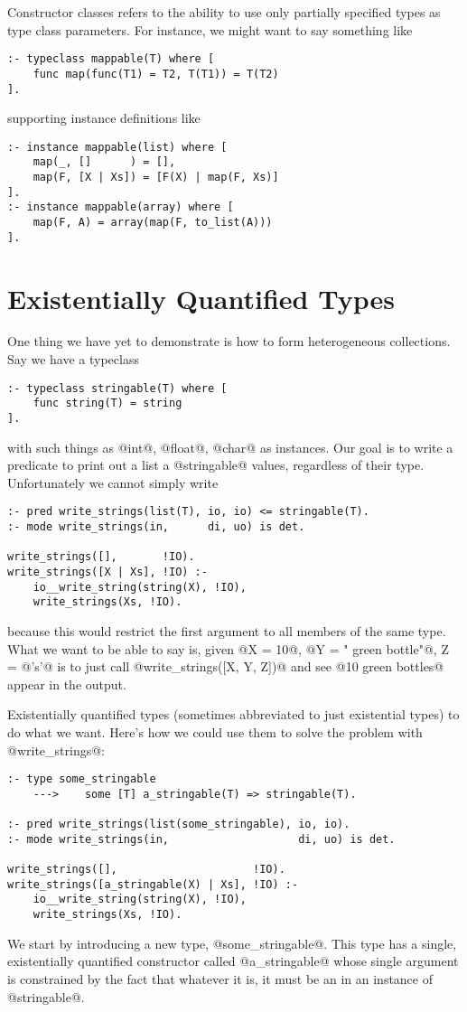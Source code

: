 Constructor classes refers to the ability to use only partially
specified types as type class parameters.  For instance, we might want
to say something like
\begin{verbatim}
:- typeclass mappable(T) where [
    func map(func(T1) = T2, T(T1)) = T(T2)
].
\end{verbatim}
supporting instance definitions like
\begin{verbatim}
:- instance mappable(list) where [
    map(_, []      ) = [],
    map(F, [X | Xs]) = [F(X) | map(F, Xs)]
].
:- instance mappable(array) where [
    map(F, A) = array(map(F, to_list(A)))
].
\end{verbatim}


\section{Existentially Quantified Types}

One thing we have yet to demonstrate is how to form heterogeneous
collections.  Say we have a typeclass
\begin{verbatim}
:- typeclass stringable(T) where [
    func string(T) = string
].
\end{verbatim}
with such things as @int@, @float@, @char@ as instances.  Our goal is to
write a predicate to print out a list a @stringable@ values, regardless
of their type.  Unfortunately we cannot simply write
\begin{verbatim}
:- pred write_strings(list(T), io, io) <= stringable(T).
:- mode write_strings(in,      di, uo) is det.

write_strings([],       !IO).
write_strings([X | Xs], !IO) :-
    io__write_string(string(X), !IO),
    write_strings(Xs, !IO).
\end{verbatim}
because this would restrict the first argument to all members of the
same type.  What we want to be able to say is, given @X = 10@,
@Y = " green bottle"@, Z = @'s'@ is to just call
@write_strings([X, Y, Z])@ and see @10 green bottles@ appear in the
output.

Existentially quantified types (sometimes abbreviated to just
existential types) to do what we want.  Here's how we could use them to
solve the problem with @write_strings@:
\begin{verbatim}
:- type some_stringable
    --->    some [T] a_stringable(T) => stringable(T).

:- pred write_strings(list(some_stringable), io, io).
:- mode write_strings(in,                    di, uo) is det.

write_strings([],                     !IO).
write_strings([a_stringable(X) | Xs], !IO) :-
    io__write_string(string(X), !IO),
    write_strings(Xs, !IO).
\end{verbatim}
We start by introducing a new type, @some_stringable@.  This type has a 
single, existentially quantified constructor called @a_stringable@ whose
single argument is constrained by the fact that whatever it is, it must
be an in an instance of @stringable@.

